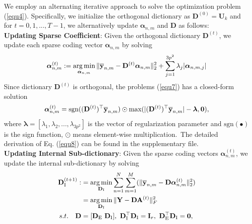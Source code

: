 \documentclass[10pt,twocolumn,letterpaper]{article}
\DeclareMathOperator*{\argmin}{arg\,min}
\begin{document}
We employ an alternating iterative approach to solve the optimization problem (\ref{equ4}). Specifically, we initialize the orthogonal dictionary as $\mathbf{D}^{(0)}=\mathbf{U}_{k}$ and for $t=0,1, ...,T-1$, we alternatively update $\bm{\alpha}_{n,m}$ and $\mathbf{D}$ as follows:
\vspace{2mm}\\
\textbf{Updating Sparse Coefficient}: Given the orthogonal dictionary $\textbf{D}^{(t)}$, we update each sparse coding vector $\bm{\alpha}_{n,m}$ by solving
\vspace{-3mm}
\begin{equation}\label{equ7}\vspace{-3mm}
\begin{split}
\bm{\alpha}_{n,m}^{(t)}:=\argmin_{\bm{\alpha}_{n,m}}
\|\mathbf{\overline{y}}_{n,m}-\mathbf{D}^{(t)}\bm{\alpha}_{n,m}\|_{2}^{2}+\sum_{j=1}^{3p^{2}}\lambda_{j}|\bm{\alpha}_{n,m,j}|
\end{split}
\end{equation}
Since dictionary $\mathbf{D}^{(t)}$ is orthogonal, the problems (\ref{equ7}) has a closed-form solution
\vspace{-2mm}
\begin{equation}\label{equ8}\vspace{-2mm}
\bm{\alpha}_{n,m}^{(t)}= \text{sgn}((\mathbf{D}^{(t)})^{\top}\mathbf{\overline{y}}_{n,m})\odot \text{max}(|(\mathbf{D}^{(t)})^{\top}\mathbf{\overline{y}}_{n,m}|-\bm{\lambda},\mathbf{0}),
\end{equation}
where $\bm{\lambda} = [\lambda_{1},\lambda_{2},...,\lambda_{3p^2}]$ is the vector of regularization parameter and $\text{sgn}(\bullet)$ is the sign function, $\odot$ means element-wise multiplication.\ The detailed derivation of Eq. (\ref{equ8}) can be found in the supplementary file.
\vspace{2mm}\\
\textbf{Updating Internal Sub-dictionary}: Given the sparse coding vectors $\bm{\alpha}_{n,m}^{(t)}$, we update the internal sub-dictionary by solving
\vspace{-2mm}
\begin{equation}\label{equ9} \vspace{-2mm}
\begin{split}
\textbf{D}_{\text{I}}^{(t+1)}
:
&
=
\argmin_{\textbf{D}_{\text{I}}}
\sum_{n=1}^{N}\sum_{m=1}^{M}(\|\mathbf{\overline{y}}_{n,m}-\mathbf{D}\bm{\alpha}_{n,m}^{(t)}\|_{2}^{2})
\\
&
=
\argmin_{\textbf{D}_{\text{I}}}
\|\mathbf{Y}-\mathbf{D}\mathbf{A}^{(t)}\|_{F}^{2}
\\
s.t.
\quad
\mathbf{D}
&
=
[\mathbf{D}_{\text{E}}\ \mathbf{D}_{\text{I}}],\ \mathbf{D}_{\text{I}}^{\top}\mathbf{D}_{\text{I}} = \mathbf{I}_{r},\ \mathbf{D}_{\text{E}}^{\top}\mathbf{D}_{\text{I}} = \mathbf{0},
\end{split}
\end{equation}
\end{document}
